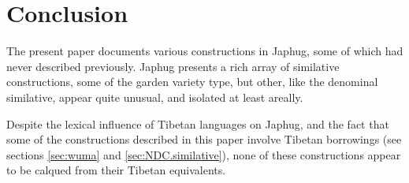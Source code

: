 \documentclass[oneside,a4paper,11pt]{article}
\begin{document}
\section*{Conclusion}
The present paper documents various constructions in Japhug, some of which had never described previously. Japhug presents a rich array of similative constructions, some of the garden variety type, but other, like the denominal similative, appear quite unusual, and isolated at least areally.

Despite the lexical influence of Tibetan languages on Japhug, and the fact that some of the constructions described in this paper involve Tibetan borrowings (see sections \ref{sec:wuma} and \ref{sec:NDC.similative}), none of these constructions appear to be calqued from their Tibetan equivalents.



\end{document}
